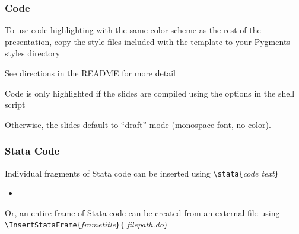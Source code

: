 \documentclass[aspectratio=169,handout]{beamer}
\begin{document}
%
%	
	
	

	


\begin{frame}
	\frametitle{Code}
	\begin{witem}
		\item To use code highlighting with the same color scheme as
			the rest of the presentation, copy the style files included
			with the template to your Pygments styles directory
		\item See directions in the README for more detail
		\item Code is only highlighted if the slides are compiled using the
			options in the shell script
		\item Otherwise, the slides default to ``draft'' mode (monospace font,
			no color).
	\end{witem}
\end{frame}
	
\begin{frame}
	\frametitle{Stata Code}
	\begin{witem}
		\item Individual fragments of Stata code can be
			inserted using \texttt{\textbackslash{}stata\{}\textit{code text}\texttt{\}}
			\begin{itemize}
				\item {}
			\end{itemize}
		\item Or, an entire frame of Stata code can be created from an external file 
			using
			\texttt{\textbackslash{}InsertStataFrame\{}\textit{frametitle}\texttt{\}\{}
\textit{filepath.do}\texttt{\}}
	\end{witem}
\end{frame}
	
	
	
\end{document}
